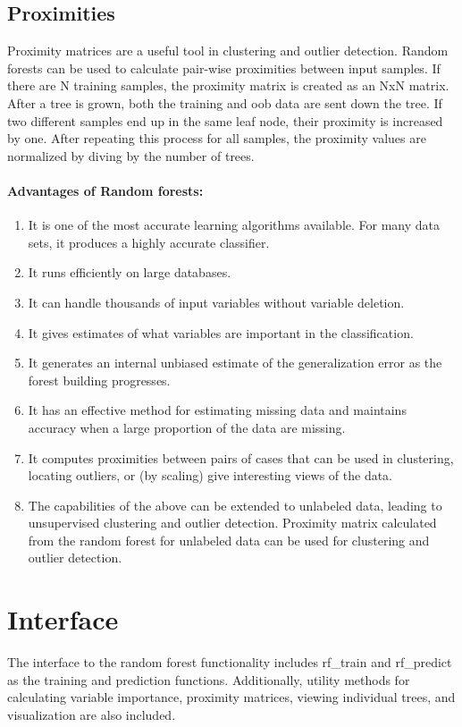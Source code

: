 \subsection{Proximities}
Proximity matrices are a useful tool in clustering and outlier detection.
Random forests can be used to calculate pair-wise proximities between input samples.
If there are N training samples, the proximity matrix is created as an NxN matrix. After a
tree is grown, both the training and oob data are sent down the tree. If two different samples
end up in the same leaf node, their proximity is increased by one. After repeating this process
for all samples, the proximity values are normalized by diving by the number of trees.

\paragraph{Advantages of Random forests:}

\begin{enumerate}
    \item It is one of the most accurate learning algorithms available. For many data sets, it
    produces a highly accurate classifier.
    \item It runs efficiently on large databases.
    \item It can handle thousands of input variables without variable deletion.
    \item It gives estimates of what variables are important in the classification.
    \item It generates an internal unbiased estimate of the generalization error as the forest
    building progresses.
    \item It has an effective method for estimating missing data and maintains accuracy
    when a large proportion of the data are missing.
    \item It computes proximities between pairs of cases that can be used in clustering, locating
    outliers, or (by scaling) give interesting views of the data.
    \item The capabilities of the above can be extended to unlabeled data, leading to
    unsupervised clustering and outlier detection. Proximity matrix calculated from the random forest 
    for unlabeled data can be used for clustering and outlier detection.
\end{enumerate}

\section{Interface} %
\label{sec:interface}
The interface to the random forest functionality includes rf\_train and rf\_predict as
the training and prediction functions. Additionally, utility methods for calculating 
variable importance, proximity matrices, viewing individual trees, and visualization 
are also included.

